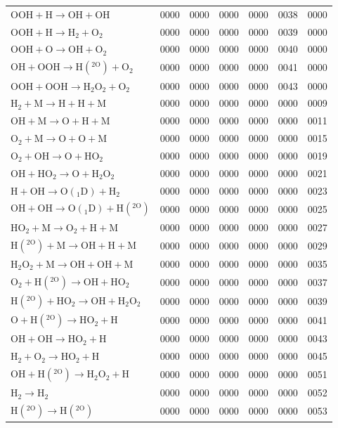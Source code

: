 \begin{longtable}{lrrrrrr}
$\mathrm{OOH + H \rightarrow OH + OH}$ & 0000 & 0000 & 0000 & 0000 & 0038 & 0000 \\
$\mathrm{OOH + H \rightarrow H_2 + O_2}$ & 0000 & 0000 & 0000 & 0000 & 0039 & 0000 \\
$\mathrm{OOH + O \rightarrow OH + O_2}$ & 0000 & 0000 & 0000 & 0000 & 0040 & 0000 \\
$\mathrm{OH + OOH \rightarrow H(^{2O}) + O_2}$ & 0000 & 0000 & 0000 & 0000 & 0041 & 0000 \\
$\mathrm{OOH + OOH \rightarrow H_2O_2 + O_2}$ & 0000 & 0000 & 0000 & 0000 & 0043 & 0000 \\
$\mathrm{H_2 + M \rightarrow H + H + M}$ & 0000 & 0000 & 0000 & 0000 & 0000 & 0009 \\
$\mathrm{OH + M \rightarrow O + H + M}$ & 0000 & 0000 & 0000 & 0000 & 0000 & 0011 \\
$\mathrm{O_2 + M \rightarrow O + O + M}$ & 0000 & 0000 & 0000 & 0000 & 0000 & 0015 \\
$\mathrm{O_2 + OH \rightarrow O + HO_2}$ & 0000 & 0000 & 0000 & 0000 & 0000 & 0019 \\
$\mathrm{OH + HO_2 \rightarrow O + H_2O_2}$ & 0000 & 0000 & 0000 & 0000 & 0000 & 0021 \\
$\mathrm{H + OH \rightarrow O(_1D) + H_2}$ & 0000 & 0000 & 0000 & 0000 & 0000 & 0023 \\
$\mathrm{OH + OH \rightarrow O(_1D) + H(^{2O})}$ & 0000 & 0000 & 0000 & 0000 & 0000 & 0025 \\
$\mathrm{HO_2 + M \rightarrow O_2 + H + M}$ & 0000 & 0000 & 0000 & 0000 & 0000 & 0027 \\
$\mathrm{H(^{2O}) + M \rightarrow OH + H + M}$ & 0000 & 0000 & 0000 & 0000 & 0000 & 0029 \\
$\mathrm{H_2O_2 + M \rightarrow OH + OH + M}$ & 0000 & 0000 & 0000 & 0000 & 0000 & 0035 \\
$\mathrm{O_2 + H(^{2O}) \rightarrow OH + HO_2}$ & 0000 & 0000 & 0000 & 0000 & 0000 & 0037 \\
$\mathrm{H(^{2O}) + HO_2 \rightarrow OH + H_2O_2}$ & 0000 & 0000 & 0000 & 0000 & 0000 & 0039 \\
$\mathrm{O + H(^{2O}) \rightarrow HO_2 + H}$ & 0000 & 0000 & 0000 & 0000 & 0000 & 0041 \\
$\mathrm{OH + OH \rightarrow HO_2 + H}$ & 0000 & 0000 & 0000 & 0000 & 0000 & 0043 \\
$\mathrm{H_2 + O_2 \rightarrow HO_2 + H}$ & 0000 & 0000 & 0000 & 0000 & 0000 & 0045 \\
$\mathrm{OH + H(^{2O}) \rightarrow H_2O_2 + H}$ & 0000 & 0000 & 0000 & 0000 & 0000 & 0051 \\
$\mathrm{H_2 \rightarrow H_2}$ & 0000 & 0000 & 0000 & 0000 & 0000 & 0052 \\
$\mathrm{H(^{2O}) \rightarrow H(^{2O})}$ & 0000 & 0000 & 0000 & 0000 & 0000 & 0053 \\
\hline
\end{longtable}
